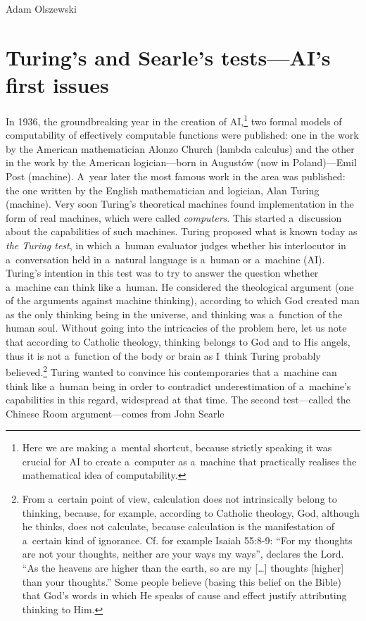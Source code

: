 \begin{artengenv}{Adam Olszewski}
\section{Turing's and Searle's tests---AI's first issues}
In 1936, the groundbreaking year in the creation of AI,\footnote{Here we are making a~mental shortcut, because strictly speaking it was crucial for AI to create a~computer as a~machine that practically realises the mathematical idea of computability.} two formal models of computability of effectively computable functions were published: one in the work by the American mathematician Alonzo Church (lambda calculus) and the other in the work by the American logician---born in Augustów (now in Poland)---Emil Post (machine). A~year later the most famous work in the area was published: the one written by the English mathematician and logician, Alan Turing (machine). Very soon Turing's theoretical machines found implementation in the form of real machines, which were called \textit{computers}. This started a~discussion about the capabilities of such machines. Turing
\parencite*[][]{turing_computing_1950} %
 proposed what is known today as \textit{the Turing test}, in which a~human evaluator judges whether his interlocutor in a~conversation held in a~natural language is a~human or a~machine (AI). Turing's intention in this test was to try to answer the question whether a~machine can think like a~human. He considered the theological argument (one of the arguments against machine thinking), according to which God created man as the only thinking being in the universe, and thinking was a~function of the human soul. Without going into the intricacies of the problem here, let us note that according to Catholic theology, thinking belongs to God and to His angels, thus it is not a~function of the body or brain as I~think Turing probably believed.\footnote{From a~certain point of view, calculation does not intrinsically belong to thinking, because, for example, according to Catholic theology, God, although he thinks, does not calculate, because calculation is the manifestation of a~certain kind of ignorance. Cf. for example Isaiah 55:8-9: ``For my thoughts are not your thoughts, neither are your ways my ways'', declares the Lord. ``As the heavens are higher than the earth, so are my [\ldots] thoughts [higher] than your thoughts.'' Some people believe (basing this belief on the Bible) that God's words in which He speaks of cause and effect justify attributing thinking to Him.} Turing wanted to convince his contemporaries that a~machine can think like a~human being in order to contradict underestimation of a~machine's capabilities in this regard, widespread at that time. The second test---called the Chinese Room argument---comes from John Searle 

\end{artengenv}
